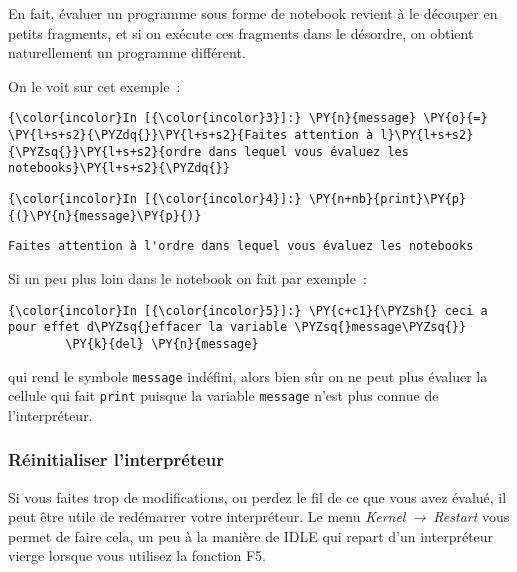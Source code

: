 En fait, évaluer un programme sous forme de notebook revient à le
découper en petits fragments, et si on exécute ces fragments dans le
désordre, on obtient naturellement un programme différent.

    On le voit sur cet exemple~:

    \begin{Verbatim}[commandchars=\\\{\}]
{\color{incolor}In [{\color{incolor}3}]:} \PY{n}{message} \PY{o}{=} \PY{l+s+s2}{\PYZdq{}}\PY{l+s+s2}{Faites attention à l}\PY{l+s+s2}{\PYZsq{}}\PY{l+s+s2}{ordre dans lequel vous évaluez les notebooks}\PY{l+s+s2}{\PYZdq{}}
\end{Verbatim}


    \begin{Verbatim}[commandchars=\\\{\}]
{\color{incolor}In [{\color{incolor}4}]:} \PY{n+nb}{print}\PY{p}{(}\PY{n}{message}\PY{p}{)}
\end{Verbatim}


    \begin{Verbatim}[commandchars=\\\{\}]
Faites attention à l'ordre dans lequel vous évaluez les notebooks

    \end{Verbatim}

    Si un peu plus loin dans le notebook on fait par exemple~:

    \begin{Verbatim}[commandchars=\\\{\}]
{\color{incolor}In [{\color{incolor}5}]:} \PY{c+c1}{\PYZsh{} ceci a pour effet d\PYZsq{}effacer la variable \PYZsq{}message\PYZsq{}}
        \PY{k}{del} \PY{n}{message}
\end{Verbatim}


    qui rend le symbole \texttt{message} indéfini, alors bien sûr on ne peut
plus évaluer la cellule qui fait \texttt{print} puisque la variable
\texttt{message} n'est plus connue de l'interpréteur.

    \hypertarget{ruxe9initialiser-linterpruxe9teur}{%
\subsubsection{Réinitialiser
l'interpréteur}\label{ruxe9initialiser-linterpruxe9teur}}

    Si vous faites trop de modifications, ou perdez le fil de ce que vous
avez évalué, il peut être utile de redémarrer votre interpréteur. Le
menu \emph{Kernel~→~Restart} vous permet de faire cela, un peu à la
manière de IDLE qui repart d'un interpréteur vierge lorsque vous
utilisez la fonction F5.

